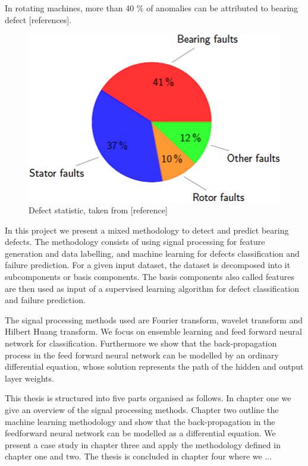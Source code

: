 \documentclass[11pt, oneside]{article}   	%
\begin{document}
\begin{flushleft}
In rotating machines, more than 40 $\%$ of anomalies can be attributed to bearing defect [references]. 
\end{flushleft}
\begin{figure}[H] %
   \centering
   \includegraphics[width=5in]{pie.png} 
   \caption{Defect statistic, taken from [reference]}
   \label{fig:pie}
\end{figure}
In this project we present a mixed methodology to detect and predict bearing defects. The methodology consists of using signal processing for feature generation and data labelling,  and machine learning for defects classification and failure prediction. For a given input dataset, the dataset is decomposed into it subcomponents or basis components. The basis components also called features are then used as input of a supervised learning algorithm for defect classification and failure prediction.
\begin{flushleft}
The signal processing methods used are Fourier transform, wavelet transform and Hilbert Huang transform. We focus on ensemble learning and feed forward neural network for classification. Furthermore we show that the back-propagation process in the feed forward neural network can be modelled by an ordinary differential equation, whose solution represents the path of the hidden and output layer weights.
\end{flushleft}


This thesis is structured into five parts organised as follows. In chapter one we give an overview of the signal processing methods. Chapter two outline the machine learning methodology and show that the back-propagation in the feedforward neural network can be modelled as a differential equation.
We present a case study in chapter three and apply the methodology defined in chapter
one and two. The thesis is concluded in chapter four where we ...
\end{document}
